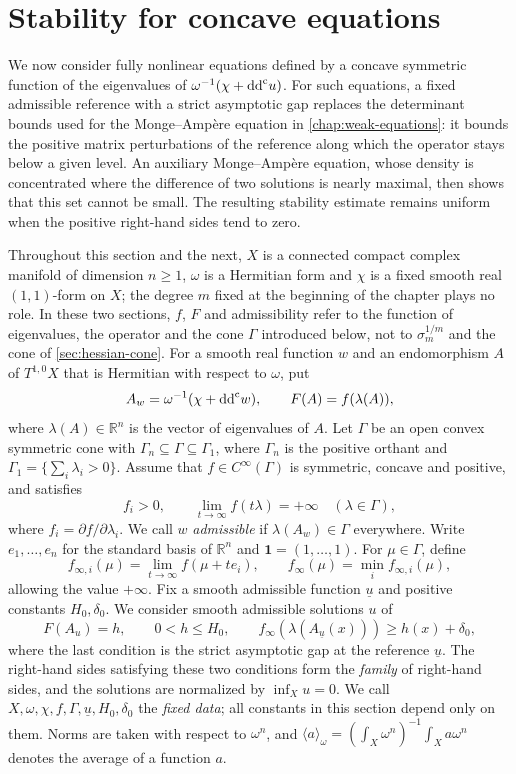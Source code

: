 \section{Stability for concave equations}
\label{sec:concave-strict-gap-stability}

We now consider fully nonlinear equations defined by a concave symmetric function of the eigenvalues of $\omega^{-1}(\chi+\mathrm{dd}^{\mathrm{c}} u)$. For such equations, a fixed admissible reference with a strict asymptotic gap replaces the determinant bounds used for the Monge--Amp\`ere equation in \cref{chap:weak-equations}: it bounds the positive matrix perturbations of the reference along which the operator stays below a given level. An auxiliary Monge--Amp\`ere equation, whose density is concentrated where the difference of two solutions is nearly maximal, then shows that this set cannot be small. The resulting stability estimate remains uniform when the positive right-hand sides tend to zero.

Throughout this section and the next, $X$ is a connected compact complex manifold of dimension $n\geq1$, $\omega$ is a Hermitian form and $\chi$ is a fixed smooth real $(1,1)$-form on $X$; the degree $m$ fixed at the beginning of the chapter plays no role. In these two sections, $f$, $F$ and admissibility refer to the function of eigenvalues, the operator and the cone $\Gamma$ introduced below, not to $\sigma_m^{1/m}$ and the cone of \cref{sec:hessian-cone}. For a smooth real function $w$ and an endomorphism $A$ of $T^{1,0}X$ that is Hermitian with respect to $\omega$, put
\[
 A_w=\omega^{-1}(\chi+\mathrm{dd}^{\mathrm{c}} w),\qquad
 F(A)=f(\lambda(A)),
\]
where $\lambda(A)\in\mathbb R^n$ is the vector of eigenvalues of $A$. Let $\Gamma$ be an open convex symmetric cone with $\Gamma_n\subseteq\Gamma\subseteq\Gamma_1$, where $\Gamma_n$ is the positive orthant and $\Gamma_1=\{\sum_i\lambda_i>0\}$. Assume that $f\in C^\infty(\Gamma)$ is symmetric, concave and positive, and satisfies
\[
 f_i>0,\qquad \lim_{t\to\infty}f(t\lambda)=+\infty
 \quad(\lambda\in\Gamma),
\]
where $f_i=\partial f/\partial\lambda_i$. We call $w$ \emph{admissible} if $\lambda(A_w)\in\Gamma$ everywhere. Write $e_1,\ldots,e_n$ for the standard basis of $\mathbb R^n$ and $\mathbf1=(1,\ldots,1)$. For $\mu\in\Gamma$, define
\[
 f_{\infty,i}(\mu)=\lim_{t\to\infty}f(\mu+te_i),\qquad
 f_\infty(\mu)=\min_i f_{\infty,i}(\mu),
\]
allowing the value $+\infty$. Fix a smooth admissible function $\underline u$ and positive constants $H_0,\delta_0$. We consider smooth admissible solutions $u$ of
\[
 F(A_u)=h,\qquad 0<h\leq H_0,\qquad
 f_\infty(\lambda(A_{\underline u}(x)))\geq h(x)+\delta_0,
\]
where the last condition is the strict asymptotic gap at the reference $\underline u$. The right-hand sides satisfying these two conditions form the \emph{family} of right-hand sides, and the solutions are normalized by $\inf_Xu=0$. We call $X,\omega,\chi,f,\Gamma,\underline u,H_0,\delta_0$ the \emph{fixed data}; all constants in this section depend only on them. Norms are taken with respect to $\omega^n$, and $\langle a\rangle_\omega=(\int_X\omega^n)^{-1}\int_Xa\omega^n$ denotes the average of a function $a$.

